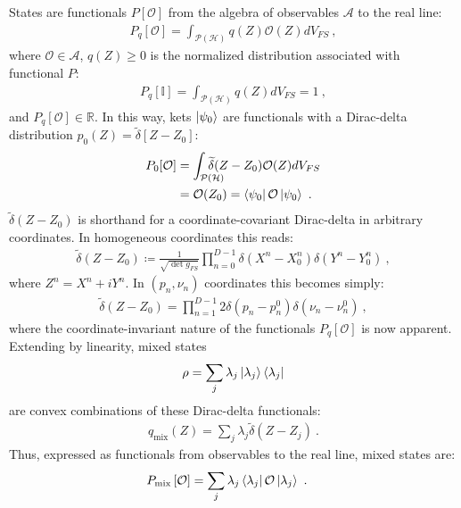 \documentclass[draft,nofootinbib,pre,twocolumn,showpacs,showkeys,preprintnumbers,floatfix]{revtex4-1}
\newcommand{\1}{\mathbbm{1}}
\newcommand{\intP}{\int_{\mathcal{P}(\mathcal{H})} \!\!\!\!\!\!\!\!\!}
\begin{document}
States are functionals $P[\mathcal{O}]$ from the algebra of
observables $\mathcal{A}$ to the real line: 
\begin{align}
P_q[\mathcal{O}]
  = \int_{\mathcal{P}(\mathcal{H})} q(Z) \mathcal{O}(Z) dV_{FS}
  ~,
\label{eq:gqs}
\end{align}
where $\mathcal{O} \in \mathcal{A}$, $q(Z) \geq 0$ is the
normalized distribution associated with functional $P$:
\begin{align*}
P_q[\mathbb{I}] = \int_{\mathcal{P}(\mathcal{H})}
  q(Z) dV_{FS}  = 1
  ~,
\end{align*}
and $P_q[\mathcal{O}] \in \mathbb{R}$. 
In this way, kets $\ket{\psi_0}$ are functionals with a Dirac-delta
distribution $p_0(Z) = \widetilde{\delta}\left[ Z - Z_0\right]$:
\begin{align*}
P_{0}[\mathcal{O}] &= \intP \widetilde{\delta}(Z-Z_0)\mathcal{O}(Z) dV_{FS} \\
  & = \mathcal{O}(Z_0)  = \bra{\psi_0}\mathcal{O}\ket{\psi_0}
  ~.
\end{align*}
$\widetilde{\delta}(Z-Z_0)$ is shorthand for a coordinate-covariant Dirac-delta in
arbitrary coordinates. In homogeneous coordinates this reads:
\begin{align*}
\widetilde{\delta}(Z - Z_0) \coloneqq \frac{1}{\sqrt{\det g_{FS}}}
  \prod_{n=0}^{D-1} \delta(X^n - X^n_0)
  \delta(Y^n - Y^n_0)
  ~,
\end{align*}
where $Z^n = X^n + iY^n$. In $(p_n,\nu_n)$ coordinates
this becomes simply:
\begin{align*}
\widetilde{\delta}(Z - Z_0) = \prod_{n=1}^{D-1} 2\delta(p_n - p_n^0) \delta(\nu_n - \nu_n^0)
  ~,
\end{align*}
where the coordinate-invariant nature of the functionals $P_q[\mathcal{O}]$ is
now apparent. Extending by linearity, mixed states
\begin{align*}
\rho = \sum_{j}\lambda_j \ket{\lambda_j}\bra{\lambda_j}
\end{align*}
are convex combinations of these Dirac-delta functionals:
\begin{align*}
q_{\mathrm{mix}}(Z) = \sum_{j}\lambda_j \widetilde{\delta}(Z-Z_j)
  ~. 
\end{align*}
Thus, expressed as functionals from observables to the real line, mixed states
are:
\begin{align}
P_{\mathrm{mix}}\left[ \mathcal{O}\right]
  & = \sum_{j} \lambda_j \bra{\lambda_j}\mathcal{O}\ket{\lambda_j}
  ~.
\label{eq:Functional}
\end{align}
\end{document}
